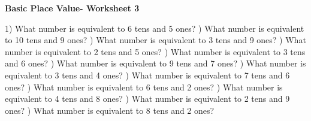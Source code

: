 \documentclass{article}%
\begin{document}
\pagebreak%
\large%
\begin{center}%
\textbf{Basic Place Value- Worksheet 3}%
\newline%
\newline%
\newline%
\end{center} \normalsize%
1) What number is equivalent to 6 tens and 5 ones?%
\newline%
\newline%
) What number is equivalent to 10 tens and 9 ones?%
\newline%
\newline%
) What number is equivalent to 3 tens and 9 ones?%
\newline%
\newline%
) What number is equivalent to 2 tens and 5 ones?%
\newline%
\newline%
) What number is equivalent to 3 tens and 6 ones?%
\newline%
\newline%
) What number is equivalent to 9 tens and 7 ones?%
\newline%
\newline%
) What number is equivalent to 3 tens and 4 ones?%
\newline%
\newline%
) What number is equivalent to 7 tens and 6 ones?%
\newline%
\newline%
) What number is equivalent to 6 tens and 2 ones?%
\newline%
\newline%
) What number is equivalent to 4 tens and 8 ones?%
\newline%
\newline%
) What number is equivalent to 2 tens and 9 ones?%
\newline%
\newline%
) What number is equivalent to 8 tens and 2 ones?%
\end{document}
